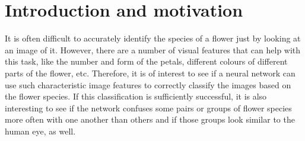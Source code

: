 \section{Introduction and motivation}
\label{sec:motivation}
It is often difficult to accurately identify the species of a flower just by looking at an image of it. 
However, there are a number of visual features that can help with this task, like the number and form of the petals, different colours of different parts of the flower, etc.
Therefore, it is of interest to see if a neural network can use such characteristic image features to correctly classify the images based on the flower species.
If this classification is sufficiently successful, it is also interesting to see if the network confuses some pairs or groups of flower species more often with one another than others
and if those groups look similar to the human eye, as well. 
